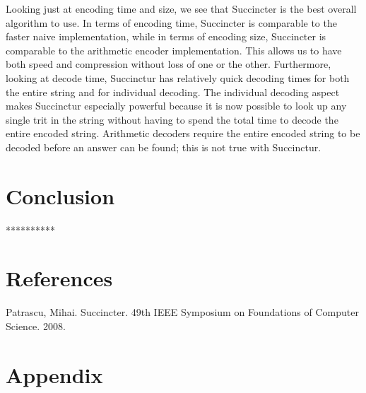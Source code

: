 \documentclass{article}
\begin{document}
Looking just at encoding time and size, we see that Succincter is the best overall algorithm to use. In terms of encoding time, Succincter is comparable to the faster naive implementation, while in terms of encoding size, Succincter is comparable to the arithmetic encoder implementation. This allows us to have both speed and compression without loss of one or the other. Furthermore, looking at decode time, Succinctur has relatively quick decoding times for both the entire string and for individual decoding. The individual decoding aspect makes Succinctur especially powerful because it is now possible to look up any single trit in the string without having to spend the total time to decode the entire encoded string. Arithmetic decoders require the entire encoded string to be decoded before an answer can be found; this is not true with Succinctur.

\noindent \section{Conclusion}

\bigskip
\centerline{**********}

\noindent \section{References}
Patrascu, Mihai. Succincter. 49th IEEE Symposium on Foundations of Computer Science. 2008.

\noindent \section*{Appendix}

%

\end{document}
